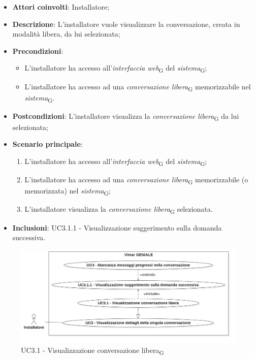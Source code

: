 \begin{itemize}
    \item \textbf{Attori coinvolti}: Installatore;
    \item \textbf{Descrizione}: L'installatore vuole visualizzare la conversazione, creata in modalità libera, da lui selezionata;
    \item \textbf{Precondizioni}: 
    \begin{itemize}
        \item L’installatore ha accesso all’\textit{interfaccia web}\textsubscript{G} del \textit{sistema}\textsubscript{G};
        \item L’installatore ha accesso ad una \textit{conversazione libera}\textsubscript{G} memorizzabile nel \textit{sistema}\textsubscript{G}.
    \end{itemize}
    \item \textbf{Postcondizioni}: L'installatore visualizza la \textit{conversazione libera}\textsubscript{G} da lui selezionata;
    \item \textbf{Scenario principale}:
    \begin{enumerate}
        \item L’installatore ha accesso all’\textit{interfaccia web}\textsubscript{G} del \textit{sistema}\textsubscript{G};
        \item L’installatore ha accesso ad una \textit{conversazione libera}\textsubscript{G} memorizzabile (o memorizzata) nel \textit{sistema}\textsubscript{G};
        \item L'installatore visualizza la \textit{conversazione libera}\textsubscript{G} selezionata.
    \end{enumerate}
    \item \textbf{Inclusioni}: UC3.1.1 - Visualizzazione suggerimento sulla domanda successiva.
\end{itemize}
\begin{figure}[H]
\centering
\includegraphics[width=1\textwidth]{contents/casi_duso/png/UC3.1.png}
\caption{UC3.1 - Visualizzazione conversazione libera\textsubscript{G}}
\end{figure}

